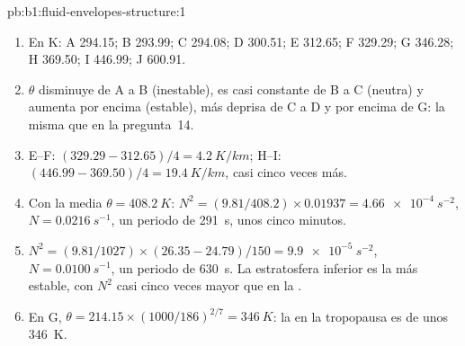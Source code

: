 \begin{solution}{pb:b1:fluid-envelopes-structure:1}
\begin{enumerate}
  \item En K: A 294.15; B 293.99; C 294.08; D 300.51; E 312.65; F 329.29; G
        346.28; H 369.50; I 446.99; J 600.91.
  \item $\theta$ disminuye de A a B (inestable), es casi constante de B a C (neutra) y aumenta por encima (estable), más deprisa de C a D y por encima de G: la misma  que en la pregunta~14.
  \item E--F: $(329.29 - 312.65)/4 = \qty{4.2}{K/km}$; H--I: $(446.99 -
        369.50)/4 = \qty{19.4}{K/km}$, casi cinco veces más.
  \item Con la media $\theta = \qty{408.2}{K}$: $N^2 = (9.81/408.2) \times
        0.01937 = \qty{4.66e-4}{s^{-2}}$, $N = \qty{0.0216}{s^{-1}}$, un periodo
        de \qty{291}{s}, unos cinco minutos.
  \item $N^2 = (9.81/1027) \times (26.35 - 24.79)/150 = \qty{9.9e-5}{s^{-2}}$,
        $N = \qty{0.0100}{s^{-1}}$, un periodo de \qty{630}{s}. La estratosfera inferior es la más estable, con $N^2$ casi cinco veces mayor que en la .
  \item En G, $\theta = 214.15 \times (1000/186)^{2/7} = \qty{346}{K}$: la  en la tropopausa es de unos \qty{346}{K}.
\end{enumerate}
\end{solution}
